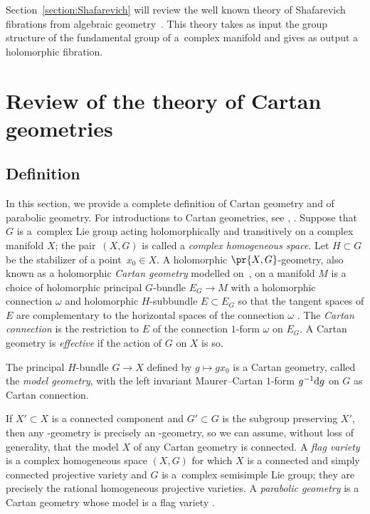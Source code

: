 \documentclass[pdftex]{sigma}
\numberwithin{equation}{section}
\begin{document}
Section~\ref{section:Shafarevich} will review the well known theory of Shafarevich fibrations from algebraic geometry~\cite{Kollar:1993,Zuo:1999}.
This theory takes as input the group structure of the fundamental group of a~complex manifold and gives as output a holomorphic fibration.


\section{Review of the theory of Cartan geometries}\label{section:review}

\subsection{Definition}

In this section, we provide a complete definition of Cartan geometry and of parabolic geometry.
For introductions to Cartan geometries, see \cite[Chapter~1]{Cap/Slovak:2009}, \cite{mckay2023introduction,Sharpe:2002}.
Suppose that $G$ is a~complex Lie group acting holomorphically and transitively on a complex manifold $X$;
the pair~$(X, G)$ is called a \emph{complex homogeneous space}.
Let $H \subset G$ be the stabilizer of a point~$x_0 \in X$.
A holomorphic $\pr{X, G}$-geometry, also known as a holomorphic \emph{Cartan geometry} modelled on~, on a manifold $M$ is a
choice of holomorphic principal $G$-bundle $E_G \to M$ with a holomorphic connection
$\omega$ and holomorphic $H$-subbundle $E \subset E_G$ so that the tangent spaces of $E$ are complementary to the horizontal
spaces of the connection $\omega$ \cite{Sharpe:2002}.
The \emph{Cartan connection} is the restriction to $E$ of the connection $1$-form $\omega$ on $E_G$.
A Cartan geometry is \emph{effective} if the action of $G$ on $X$ is so.

The principal $H$-bundle $G \to X$ defined by $g \longmapsto gx_0$ is a Cartan geometry, called the \emph{model
geometry}, with the left invariant Maurer--Cartan $1$-form $g^{-1} {\rm d}g$ on $G$ as Cartan connection.

If $X' \subset X$ is a connected component and $G' \subset G$ is the subgroup preserving $X'$, then any -geometry
is precisely an -geometry, so we can assume, without loss of generality, that the model $X$ of any Cartan geometry is connected.
A \emph{flag variety} is a complex homogeneous space $(X, G)$ for which $X$ is a connected and simply connected projective variety
and $G$ is a~complex semisimple Lie group; they are precisely the rational homogeneous projective varieties.
A \emph{parabolic geometry} is a Cartan geometry whose model is a flag variety \cite{Cap/Slovak:2009}.
\end{document}
